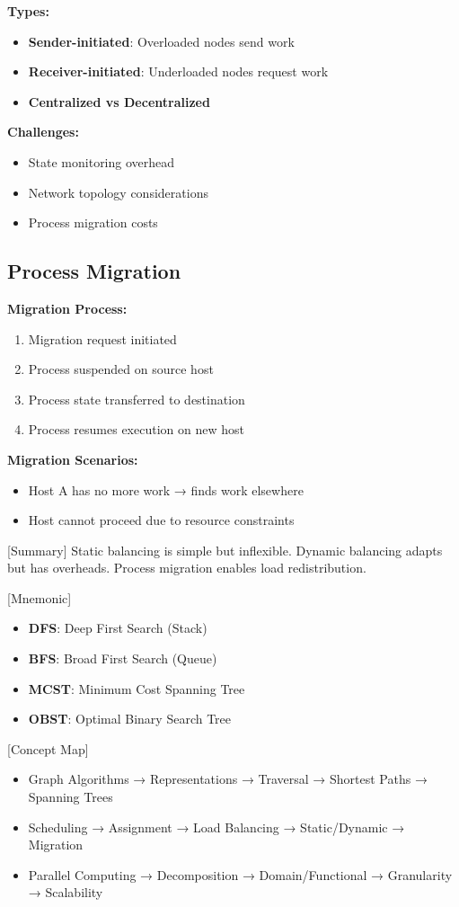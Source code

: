 \documentclass[12pt]{article}
\begin{document}
\textbf{Types:}
\begin{itemize}
    \item \textbf{Sender-initiated}: Overloaded nodes send work
    \item \textbf{Receiver-initiated}: Underloaded nodes request work
    \item \textbf{Centralized vs Decentralized}
\end{itemize}

\textbf{Challenges:}
\begin{itemize}
    \item State monitoring overhead
    \item Network topology considerations
    \item Process migration costs
\end{itemize}

\subsection{Process Migration}

\textbf{Migration Process:}
\begin{enumerate}
    \item Migration request initiated
    \item Process suspended on source host
    \item Process state transferred to destination
    \item Process resumes execution on new host
\end{enumerate}

\textbf{Migration Scenarios:}
\begin{itemize}
    \item Host A has no more work → finds work elsewhere
    \item Host cannot proceed due to resource constraints
\end{itemize}

[Summary] Static balancing is simple but inflexible. Dynamic balancing adapts but has overheads. Process migration enables load redistribution.


[Mnemonic]
\begin{itemize}
    \item \textbf{DFS}: Deep First Search (Stack)
    \item \textbf{BFS}: Broad First Search (Queue)
    \item \textbf{MCST}: Minimum Cost Spanning Tree
    \item \textbf{OBST}: Optimal Binary Search Tree
\end{itemize}

[Concept Map]
\begin{itemize}
    \item Graph Algorithms → Representations → Traversal → Shortest Paths → Spanning Trees
    \item Scheduling → Assignment → Load Balancing → Static/Dynamic → Migration
    \item Parallel Computing → Decomposition → Domain/Functional → Granularity → Scalability
\end{itemize}
\end{document}
